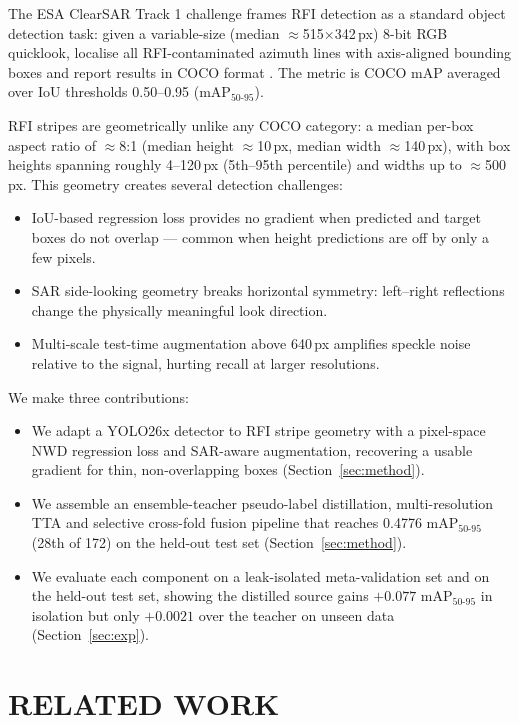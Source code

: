 \documentclass{article}
\begin{document}
The ESA ClearSAR Track 1 challenge \cite{clearsar2026} frames RFI
detection as a standard object detection task: given a variable-size
(median $\approx$515$\times$342\,px) 8-bit RGB quicklook, localise all
RFI-contaminated azimuth lines
with axis-aligned bounding boxes and report results in COCO format
\cite{lin2014coco}. The metric is COCO mAP averaged over IoU thresholds
0.50--0.95 (mAP$_{50\text{-}95}$).

RFI stripes are geometrically unlike any COCO category: a median
per-box aspect ratio of $\approx$8:1 (median height $\approx$10\,px,
median width $\approx$140\,px), with box heights spanning roughly
4--120\,px (5th--95th percentile) and widths up to $\approx$500\,px.
This geometry creates several detection challenges:
\begin{itemize}[noitemsep,leftmargin=*]
  \item IoU-based regression loss provides no gradient when predicted
  and target boxes do not overlap --- common when height predictions are
  off by only a few pixels.
  \item SAR side-looking geometry breaks horizontal symmetry: left--right
  reflections change the physically meaningful look direction.
  \item Multi-scale test-time augmentation above 640\,px amplifies
  speckle noise relative to the signal, hurting recall at larger
  resolutions.
\end{itemize}

We make three contributions:
\begin{itemize}[noitemsep,leftmargin=*]
  \item We adapt a YOLO26x detector to RFI stripe geometry with a
  pixel-space NWD regression loss and SAR-aware augmentation, recovering
  a usable gradient for thin, non-overlapping boxes
  (Section~\ref{sec:method}).
  \item We assemble an ensemble-teacher pseudo-label distillation,
  multi-resolution TTA and selective cross-fold fusion pipeline that
  reaches 0.4776 mAP$_{50\text{-}95}$ (28th of 172) on the held-out test
  set (Section~\ref{sec:method}).
  \item We evaluate each component on a leak-isolated meta-validation
  set and on the held-out test set, showing the distilled source gains
  $+0.077$ mAP$_{50\text{-}95}$ in isolation but only $+0.0021$ over the
  teacher on unseen data (Section~\ref{sec:exp}).
\end{itemize}

\section{RELATED WORK}
\label{sec:rw}
\end{document}
